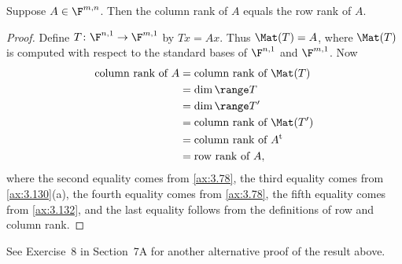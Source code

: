 \begin{result}\label{ax:3.133}
Suppose $A\in\F^{m,n}$. Then the column rank of $A$ equals the row rank of $A$.
\end{result}

\begin{proof}
Define $T\colon\F^{n,1}\to\F^{m,1}$ by $Tx=Ax$. Thus $\Mat(T)=A$, where
$\Mat(T)$ is computed with respect to the standard bases of $\F^{n,1}$ and
$\F^{m,1}$. Now
\begin{align*}
\text{column rank of } A &= \text{column rank of } \Mat(T)\\
  &= \dim\range T\\
  &= \dim\range T'\\
  &= \text{column rank of } \Mat(T')\\
  &= \text{column rank of } A^{\mathrm{t}}\\
  &= \text{row rank of } A,
\end{align*}
where the second equality comes from \ref{ax:3.78}, the third equality comes
from \ref{ax:3.130}(a), the fourth equality comes from \ref{ax:3.78}, the fifth
equality comes from \ref{ax:3.132}, and the last equality follows from the
definitions of row and column rank.
\end{proof}

See Exercise~8 in Section~7A for another alternative proof of the result above.

